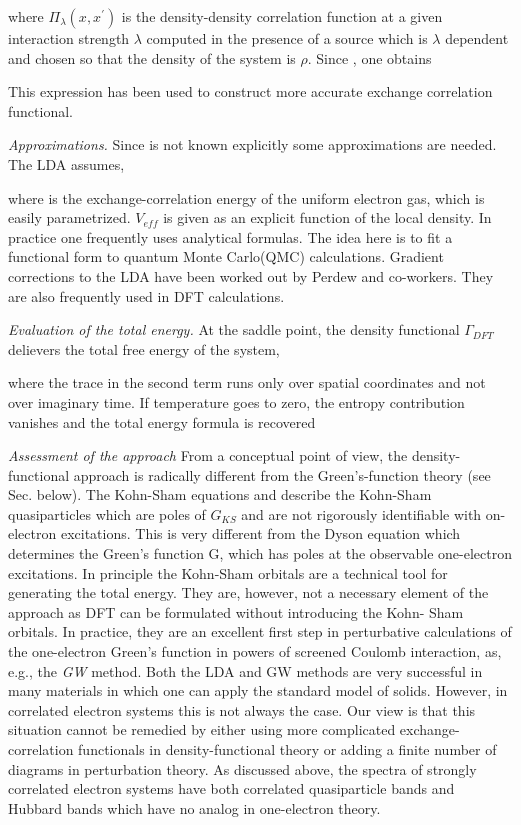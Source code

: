 \documentclass[12 pt]{article}
\begin{document}
{  where $\Pi_{\lambda}(x, x^{\prime})$ is the density-density correlation function at a given interaction strength 
$\lambda$ computed in the presence of a source which is $\lambda$ dependent and chosen so that the density of the 
system is $\rho$. Since , one obtains

  This expression has been used to construct more accurate exchange correlation functional. 

  \emph{Approximations. } Since is not known explicitly some approximations are needed. The LDA assumes,

  where is the exchange-correlation energy of the uniform electron gas, which is easily parametrized. $V_{eff}$ is 
given as an explicit function of the local density. In practice one frequently uses analytical formulas. The idea 
here is to fit a functional form to quantum Monte Carlo(QMC) calculations. Gradient corrections to the LDA have been 
worked out by Perdew and co-workers. They are also frequently used in DFT calculations. 

  \emph{Evaluation of the total energy.} At the saddle point, the density functional $\Gamma_{DFT}$ delievers the 
total free energy of the system,

  where the trace in the second term runs only over spatial coordinates and not over imaginary time. If temperature 
goes to zero, the entropy contribution vanishes and the total energy formula is recovered

  \emph{Assessment of the approach} From a conceptual point of view, the density-functional approach is radically 
different from the Green's-function theory (see Sec. below). The Kohn-Sham equations and describe the Kohn-Sham 
quasiparticles which are poles of $G_{KS}$ and are not rigorously identifiable with on-electron excitations. This 
is very different from the Dyson equation which determines the Green's function G, which has poles at the observable 
one-electron excitations. In principle the Kohn-Sham orbitals are a technical tool for generating the total energy. 
They are, however, not a necessary element of the approach as DFT can be formulated without introducing the Kohn-
Sham orbitals. In practice, they are an excellent first step in perturbative calculations of the one-electron Green's 
function in powers of screened Coulomb interaction, as, e.g., the \emph{GW} method. Both the LDA and GW methods are 
very successful in many materials in which one can apply the standard model of solids. However, in correlated electron 
systems this is not always the case. Our view is that this situation cannot be remedied by either using more complicated 
exchange-correlation functionals in density-functional theory or adding a finite number of diagrams in perturbation theory. 
As discussed above, the spectra of strongly correlated electron systems have both correlated quasiparticle bands and 
Hubbard bands which have no analog in one-electron theory.

}
\end{document}
